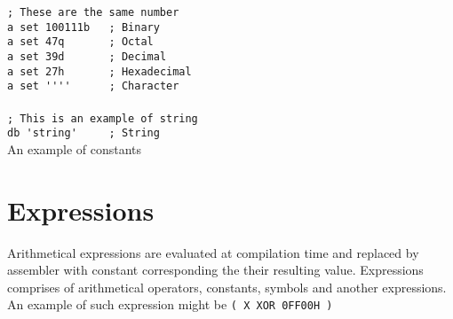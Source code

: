 \documentclass[a4paper,twoside,12pt]{book}
\newcommand{\mysmallfont}{\fontsize{8pt}{10pt} \selectfont{}}
\begin{document}
		\begin{code}[h!]
			\mysmallfont{}
			{\color{highlight_comment}\verb'; These are the same number'}\\
			{\color{highlight_constant}\verb'a'}\verb' '{\color{highlight_directive}\verb'set'}\verb' '{\color{highlight_bin}\verb'100111b'}\verb'   '{\color{highlight_comment}\verb'; Binary'}\\
			{\color{highlight_constant}\verb'a'}\verb' '{\color{highlight_directive}\verb'set'}\verb' '{\color{highlight_oct}\verb'47q'}\verb'       '{\color{highlight_comment}\verb'; Octal'}\\
			{\color{highlight_constant}\verb'a'}\verb' '{\color{highlight_directive}\verb'set'}\verb' '{\color{highlight_dec}\verb'39d'}\verb'       '{\color{highlight_comment}\verb'; Decimal'}\\
			{\color{highlight_constant}\verb'a'}\verb' '{\color{highlight_directive}\verb'set'}\verb' '{\color{highlight_hex}\verb'27h'}\verb'       '{\color{highlight_comment}\verb'; Hexadecimal'}\\
			{\color{highlight_constant}\verb'a'}\verb' '{\color{highlight_directive}\verb'set'}\verb' '{\color{highlight_string}\verb''\verb"'"\verb''\verb"'"\verb''\verb"'"\verb''\verb"'"\verb''}\verb'      '{\color{highlight_comment}\verb'; Character'}\\
			\verb''\\
			{\color{highlight_comment}\verb'; This is an example of string'}\\
			{\color{highlight_directive}\verb'db'}\verb' '{\color{highlight_string}\verb''\verb"'"\verb'string'\verb"'"\verb''}\verb'     '{\color{highlight_comment}\verb'; String'}\\

			\caption{An example of constants}
		\end{code}

	\section{Expressions}
		Arithmetical expressions are evaluated at compilation time and replaced by assembler with constant corresponding the their resulting value. Expressions comprises of arithmetical operators, constants, symbols and another expressions. An example of such expression might be \texttt{(~X~XOR~0FF00H~)}
\end{document}
